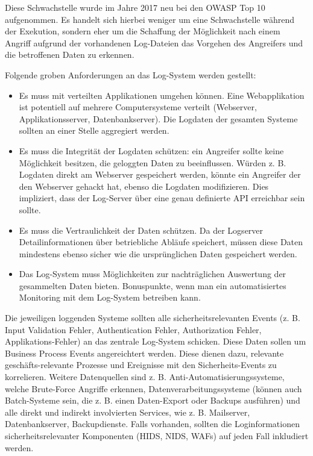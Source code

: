 Diese Schwachstelle wurde im Jahre 2017 neu bei den OWASP Top 10 aufgenommen. Es handelt sich hierbei weniger um eine Schwachstelle während der Exekution, sondern eher um die Schaffung der Möglichkeit nach einem Angriff aufgrund der vorhandenen Log-Dateien das Vorgehen des Angreifers und die betroffenen Daten zu erkennen.

Folgende groben Anforderungen an das Log-System werden gestellt:

\begin{itemize}
	\item Es muss mit verteilten Applikationen umgehen können. Eine Webapplikation ist potentiell auf mehrere Computersysteme verteilt (Webserver, Applikationsserver, Datenbankserver). Die Logdaten der gesamten Systeme sollten an einer Stelle aggregiert werden.
	\item Es muss die Integrität der Logdaten schützen: ein Angreifer sollte keine Möglichkeit besitzen, die geloggten Daten zu beeinflussen. Würden z. B. Logdaten direkt am Webserver gespeichert werden, könnte ein Angreifer der den Webserver gehackt hat, ebenso die Logdaten modifizieren. Dies impliziert, dass der Log-Server über eine genau definierte API erreichbar sein sollte.
	\item Es muss die Vertraulichkeit der Daten schützen. Da der Logserver Detailinformationen über betriebliche Abläufe speichert, müssen diese Daten mindestens ebenso sicher wie die ursprünglichen Daten gespeichert werden.
	\item Das Log-System muss Möglichkeiten zur nachträglichen Auswertung der gesammelten Daten bieten. Bonuspunkte, wenn man ein automatisiertes Monitoring mit dem Log-System betreiben kann.
\end{itemize}

Die jeweiligen loggenden Systeme sollten alle sicherheitsrelevanten Events (z. B. Input Validation Fehler, Authentication Fehler, Authorization Fehler, Applikations-Fehler) an das zentrale Log-System schicken. Diese Daten sollen um Business Process Events angereichtert werden. Diese dienen dazu, relevante geschäfts-relevante Prozesse und Ereignisse mit den Sicherheits-Events zu korrelieren. Weitere Datenquellen sind z. B. Anti-Automatisierungssysteme, welche Brute-Force Angriffe erkennen, Datenverarbeitungssysteme (können auch Batch-Systeme sein, die z. B. einen Daten-Export oder Backups ausführen) und alle direkt und indirekt involvierten Services, wie z. B. Mailserver, Datenbankserver, Backupdienste. Falls vorhanden, sollten die Loginformationen sicherheitsrelevanter Komponenten (HIDS, NIDS, WAFs) auf jeden Fall inkludiert werden.


